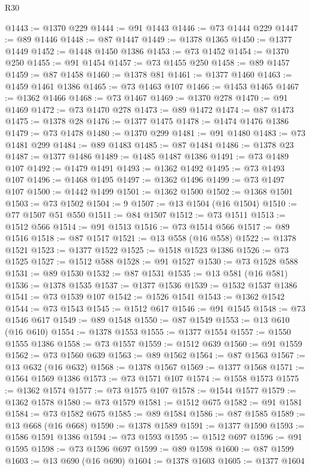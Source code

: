 \begin{lexlean}{R30}
\begin{coremodule}
{{{{{@1443 := @1370 @229
@1444 := @91 @1443
@1446 := @73 @1444 @229
@1447 := @89 @1446
@1448 := @87 @1447
@1449 := @1378 @1365
@1450 := @1377 @1449
@1452 := @1448 @1450 @1386
@1453 := @73 @1452
@1454 := @1370 @250
@1455 := @91 @1454
@1457 := @73 @1455 @250
@1458 := @89 @1457
@1459 := @87 @1458
@1460 := @1378 @81
@1461 := @1377 @1460
@1463 := @1459 @1461 @1386
@1465 := @73 @1463 @107
@1466 := @1453 @1465
@1467 := @1362 @1466
@1468 := @73 @1467
@1469 := @1370 @278
@1470 := @91 @1469
@1472 := @73 @1470 @278
@1473 := @89 @1472
@1474 := @87 @1473
@1475 := @1378 @28
@1476 := @1377 @1475
@1478 := @1474 @1476 @1386
@1479 := @73 @1478
@1480 := @1370 @299
@1481 := @91 @1480
@1483 := @73 @1481 @299
@1484 := @89 @1483
@1485 := @87 @1484
@1486 := @1378 @23
@1487 := @1377 @1486
@1489 := @1485 @1487 @1386
@1491 := @73 @1489 @107
@1492 := @1479 @1491
@1493 := @1362 @1492
@1495 := @73 @1493 @107
@1496 := @1468 @1495
@1497 := @1362 @1496
@1499 := @73 @1497 @107
@1500 := @1442 @1499
@1501 := @1362 @1500
@1502 := @1368 @1501
@1503 := @73 @1502
@1504 := 9
@1507 := @13 @1504 (@16 @1504)
@1510 := @77 @1507 @51 @550
@1511 := @84 @1507
@1512 := @73 @1511
@1513 := @1512 @566
@1514 := @91 @1513
@1516 := @73 @1514 @566
@1517 := @89 @1516
@1518 := @87 @1517
@1521 := @13 @558 (@16 @558)
@1522 := @1378 @1521
@1523 := @1377 @1522
@1525 := @1518 @1523 @1386
@1526 := @73 @1525
@1527 := @1512 @588
@1528 := @91 @1527
@1530 := @73 @1528 @588
@1531 := @89 @1530
@1532 := @87 @1531
@1535 := @13 @581 (@16 @581)
@1536 := @1378 @1535
@1537 := @1377 @1536
@1539 := @1532 @1537 @1386
@1541 := @73 @1539 @107
@1542 := @1526 @1541
@1543 := @1362 @1542
@1544 := @73 @1543
@1545 := @1512 @617
@1546 := @91 @1545
@1548 := @73 @1546 @617
@1549 := @89 @1548
@1550 := @87 @1549
@1553 := @13 @610 (@16 @610)
@1554 := @1378 @1553
@1555 := @1377 @1554
@1557 := @1550 @1555 @1386
@1558 := @73 @1557
@1559 := @1512 @639
@1560 := @91 @1559
@1562 := @73 @1560 @639
@1563 := @89 @1562
@1564 := @87 @1563
@1567 := @13 @632 (@16 @632)
@1568 := @1378 @1567
@1569 := @1377 @1568
@1571 := @1564 @1569 @1386
@1573 := @73 @1571 @107
@1574 := @1558 @1573
@1575 := @1362 @1574
@1577 := @73 @1575 @107
@1578 := @1544 @1577
@1579 := @1362 @1578
@1580 := @73 @1579
@1581 := @1512 @675
@1582 := @91 @1581
@1584 := @73 @1582 @675
@1585 := @89 @1584
@1586 := @87 @1585
@1589 := @13 @668 (@16 @668)
@1590 := @1378 @1589
@1591 := @1377 @1590
@1593 := @1586 @1591 @1386
@1594 := @73 @1593
@1595 := @1512 @697
@1596 := @91 @1595
@1598 := @73 @1596 @697
@1599 := @89 @1598
@1600 := @87 @1599
@1603 := @13 @690 (@16 @690)
@1604 := @1378 @1603
@1605 := @1377 @1604
}}}}}
\end{coremodule}
\end{lexlean}
